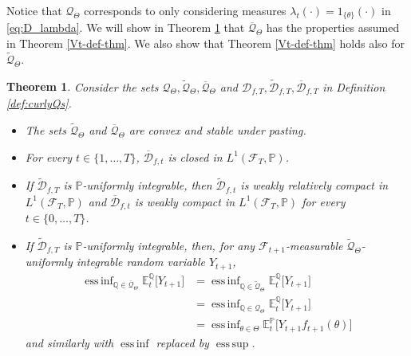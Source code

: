 \documentclass[11pt,a4paper]{article}
\newtheorem{theorem}{Theorem}
\newcommand{\E}{\mathbb{E}}
\DeclareMathOperator*{\esssup}{ess\,sup}
\DeclareMathOperator*{\essinf}{ess\,inf}
\renewcommand{\P}{\mathbb{P}}
\newcommand{\Q}{\mathbb{Q}}
\newcommand{\calF}{\mathcal{F}}
\newcommand{\calQ}{\mathcal{Q}}
\newcommand{\calD}{\mathcal{D}}
\begin{document}
Notice that $\calQ_{\Theta}$ corresponds to only considering measures $\lambda_t(\cdot)=1_{\{\theta\}}(\cdot)$ in \eqref{eq:D_lambda}. 
We will show in Theorem \ref{thm:general_prior_example} that $\overline{\calQ}_{\Theta}$ has the properties assumed in Theorem \ref{Vt-def-thm}. We also show that Theorem \ref{Vt-def-thm} holds also for $\widetilde{\calQ}_{\Theta}$. 

\begin{theorem}\label{thm:general_prior_example}
Consider the sets $\calQ_{\Theta},\widetilde{\calQ}_{\Theta},\overline{\calQ}_{\Theta}$ and $\calD_{f,T},\widetilde{\calD}_{f,T},\overline{\calD}_{f,T}$ in Definition \ref{def:curlyQs}. 
\begin{itemize}
\item[(i)] The sets $\widetilde{\calQ}_{\Theta}$ and $\overline{\calQ}_{\Theta}$ are convex and stable under pasting. 
\item[(ii)] For every $t\in\{1,\dots,T\}$, $\overline{\calD}_{f,t}$ is closed in $L^1(\calF_T,\P)$. 
\item[(iii)] If $\widetilde{\calD}_{f,T}$ is $\P$-uniformly integrable, then $\widetilde{\calD}_{f,t}$ is weakly relatively compact in $L^1(\calF_T,\P)$ and $\overline{\calD}_{f,t}$ is weakly compact in $L^1(\calF_T,\P)$ for every $t\in\{0,\dots,T\}$. 
\item[(iv)] If $\widetilde{\calD}_{f,T}$ is $\P$-uniformly integrable, then, for any $\calF_{t+1}$-measurable $\widetilde{\calQ}_{\Theta}$-uniformly integrable random variable $Y_{t+1}$, 
\begin{align*}
\essinf_{\Q \in \overline{\calQ}_{\Theta}}\E^\Q_t\big[Y_{t+1}\big]
&=\essinf_{\Q \in \widetilde{\calQ}_{\Theta}}\E^\Q_t\big[Y_{t+1}\big]\\
&=\essinf_{\Q \in \calQ_{\Theta}}\E^\Q_t\big[Y_{t+1}\big]\\
&=\essinf_{\theta  \in \Theta} \E^\P_t\big[Y_{t+1} f_{t+1}(\theta)\big]
\end{align*}
and similarly with $\essinf$ replaced by $\esssup$. 
\end{itemize}
\end{theorem}
\end{document}
